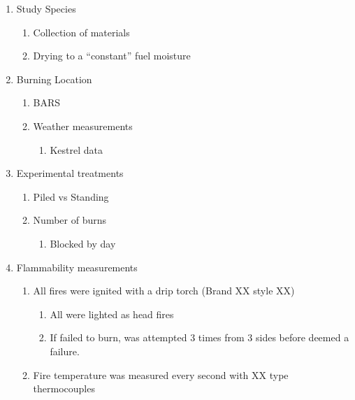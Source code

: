 \documentclass[11pt,a4paper]{article}
\providecommand{\tightlist}{%
  \setlength{\itemsep}{0pt}\setlength{\parskip}{0pt}}
\begin{document}
\begin{enumerate}
\def\labelenumi{\arabic{enumi}.}
\item
  Study Species

  \begin{enumerate}
  \def\labelenumii{\alph{enumii}.}
  \item
    Collection of materials
  \item
    Drying to a ``constant'' fuel moisture
  \end{enumerate}
\item
  Burning Location

  \begin{enumerate}
  \def\labelenumii{\alph{enumii}.}
  \item
    BARS
  \item
    Weather measurements

    \begin{enumerate}
    \def\labelenumiii{\roman{enumiii}.}
    \tightlist
    \item
      Kestrel data
    \end{enumerate}
  \end{enumerate}
\item
  Experimental treatments

  \begin{enumerate}
  \def\labelenumii{\alph{enumii}.}
  \item
    Piled vs Standing
  \item
    Number of burns

    \begin{enumerate}
    \def\labelenumiii{\roman{enumiii}.}
    \tightlist
    \item
      Blocked by day
    \end{enumerate}
  \end{enumerate}
\item
  Flammability measurements

  \begin{enumerate}
  \def\labelenumii{\alph{enumii}.}
  \item
    All fires were ignited with a drip torch (Brand XX style XX)

    \begin{enumerate}
    \def\labelenumiii{\roman{enumiii}.}
    \tightlist
    \item
      All were lighted as head fires
    \item
      If failed to burn, was attempted 3 times from 3 sides before
      deemed a failure.
    \end{enumerate}
  \item
    Fire temperature was measured every second with XX type
    thermocouples


\end{enumerate}
\end{enumerate}
\end{document}
